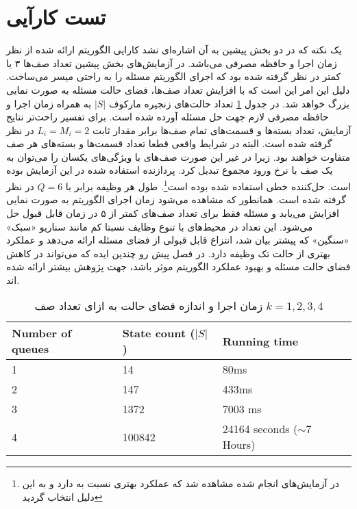 \section{تست کارآیی}
یک نکته که در دو بخش پیشین به آن اشاره‌ای نشد کارایی الگوریتم ارائه شده از نظر زمان اجرا و حافظه مصرفی می‌باشد. در آزمایش‌های بخش پیشین تعداد صف‌ها ۳ یا کمتر در نظر گرفته شده بود که اجرای الگوریتم مسئله را به راحتی میسر می‌ساخت. دلیل این امر این است که با افزایش تعداد صف‌ها، فضای حالت مسئله به صورت نمایی بزرگ خواهد شد. در جدول \ref{table:statespace} تعداد حالت‌های زنجیره مارکوف $|S|$ به همراه زمان اجرا و حافظه مصرفی لازم جهت حل مسئله آورده شده است. برای تفسیر راحت‌تر نتایج آزمایش، تعداد بسته‌ها و قسمت‌های تمام صف‌ها برابر مقدار ثابت $L_i = M_i = 2$ در نظر گرفته شده است. البته در شرایط واقعی قطعا تعداد قسمت‌ها و بسته‌‌های هر صف متفاوت خواهند بود. زیرا در غیر این صورت صف‌های با ویژگی‌های یکسان را می‌توان به یک صف با نرخ ورود مجموع تبدیل کرد. پردازنده استفاده شده در این آزمایش  بوده است. حل‌کننده خطی استفاده شده  بوده است\footnote{در آزمایش‌های انجام شده مشاهده شد که  عملکرد بهتری نسبت به  دارد و به این دلیل انتخاب گردید}. طول هر وظیفه برابر با $Q = 6$ در نظر گرفته شده است. همانطور که مشاهده می‌شود زمان اجرای الگوریتم به صورت نمایی افزایش می‌یابد و مسئله فقط برای تعداد صف‌های کمتر از ۵ در زمان قابل قبول حل می‌شود. این تعداد در محیط‌های با تنوع وظایف نسبتا کم مانند سناریو «سبک»‌ «سنگین» که پیشتر بیان شد، انتزاع قابل قبولی از فضای مسئله ارائه می‌دهد و عملکرد بهتری از حالت تک وظیفه دارد. در فصل پیش رو چندین ایده که می‌تواند در کاهش فضای حالت مسئله و بهبود عملکرد الگوریتم موثر باشد، جهت پژوهش بیشتر ارائه شده اند.
\begin{table}[H]
	\centering
	\begin{latin}
\begin{tabular}{@{}lll@{}}
	\toprule
	Number of queues & State count ($|S|$) & Running time                  \\ \midrule
	1                & 14                & 80ms                          \\
	2                & 147               & 433ms                         \\
	3                & 1372              & 7003 ms                       \\
	4                & 100842            & 24164 seconds ($\sim$7 Hours) \\ \bottomrule
\end{tabular}
	\end{latin}
	\caption{زمان اجرا و اندازه فضای حالت به ازای تعداد صف $k = 1, 2, 3, 4$}
	\label{table:statespace}
\end{table}
\clearpage
